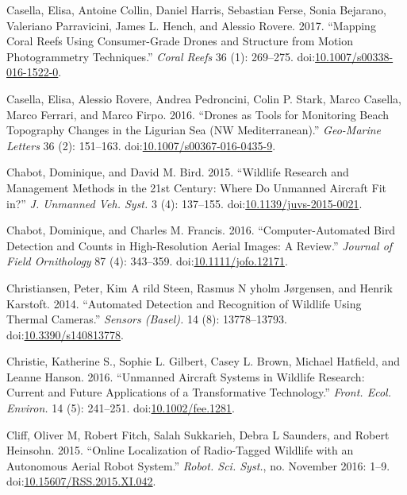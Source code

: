 \documentclass[]{interact}
\theoremstyle{plain}%
\theoremstyle{definition}
\theoremstyle{remark}
\begin{document}
\hypertarget{ref-casella_mapping_2017}{}
Casella, Elisa, Antoine Collin, Daniel Harris, Sebastian Ferse, Sonia
Bejarano, Valeriano Parravicini, James L. Hench, and Alessio Rovere.
2017. ``Mapping Coral Reefs Using Consumer-Grade Drones and Structure
from Motion Photogrammetry Techniques.'' \emph{Coral Reefs} 36 (1):
269--275.
doi:\href{https://doi.org/10.1007/s00338-016-1522-0}{10.1007/s00338-016-1522-0}.

\hypertarget{ref-casella_drones_2016}{}
Casella, Elisa, Alessio Rovere, Andrea Pedroncini, Colin P. Stark, Marco
Casella, Marco Ferrari, and Marco Firpo. 2016. ``Drones as Tools for
Monitoring Beach Topography Changes in the Ligurian Sea (NW
Mediterranean).'' \emph{Geo-Marine Letters} 36 (2): 151--163.
doi:\href{https://doi.org/10.1007/s00367-016-0435-9}{10.1007/s00367-016-0435-9}.

\hypertarget{ref-chabot_wildlife_2015}{}
Chabot, Dominique, and David M. Bird. 2015. ``Wildlife Research and
Management Methods in the 21st Century: Where Do Unmanned Aircraft Fit
in?'' \emph{J. Unmanned Veh. Syst.} 3 (4): 137--155.
doi:\href{https://doi.org/10.1139/juvs-2015-0021}{10.1139/juvs-2015-0021}.

\hypertarget{ref-chabot_computer-automated_2016}{}
Chabot, Dominique, and Charles M. Francis. 2016. ``Computer-Automated
Bird Detection and Counts in High-Resolution Aerial Images: A Review.''
\emph{Journal of Field Ornithology} 87 (4): 343--359.
doi:\href{https://doi.org/10.1111/jofo.12171}{10.1111/jofo.12171}.

\hypertarget{ref-christiansen_automated_2014}{}
Christiansen, Peter, Kim A rild Steen, Rasmus N yholm Jørgensen, and
Henrik Karstoft. 2014. ``Automated Detection and Recognition of Wildlife
Using Thermal Cameras.'' \emph{Sensors (Basel).} 14 (8): 13778--13793.
doi:\href{https://doi.org/10.3390/s140813778}{10.3390/s140813778}.

\hypertarget{ref-christie_unmanned_2016}{}
Christie, Katherine S., Sophie L. Gilbert, Casey L. Brown, Michael
Hatfield, and Leanne Hanson. 2016. ``Unmanned Aircraft Systems in
Wildlife Research: Current and Future Applications of a Transformative
Technology.'' \emph{Front. Ecol. Environ.} 14 (5): 241--251.
doi:\href{https://doi.org/10.1002/fee.1281}{10.1002/fee.1281}.

\hypertarget{ref-cliff_online_2015}{}
Cliff, Oliver M, Robert Fitch, Salah Sukkarieh, Debra L Saunders, and
Robert Heinsohn. 2015. ``Online Localization of Radio-Tagged Wildlife
with an Autonomous Aerial Robot System.'' \emph{Robot. Sci. Syst.}, no.
November 2016: 1--9.
doi:\href{https://doi.org/10.15607/RSS.2015.XI.042}{10.15607/RSS.2015.XI.042}.
\end{document}
